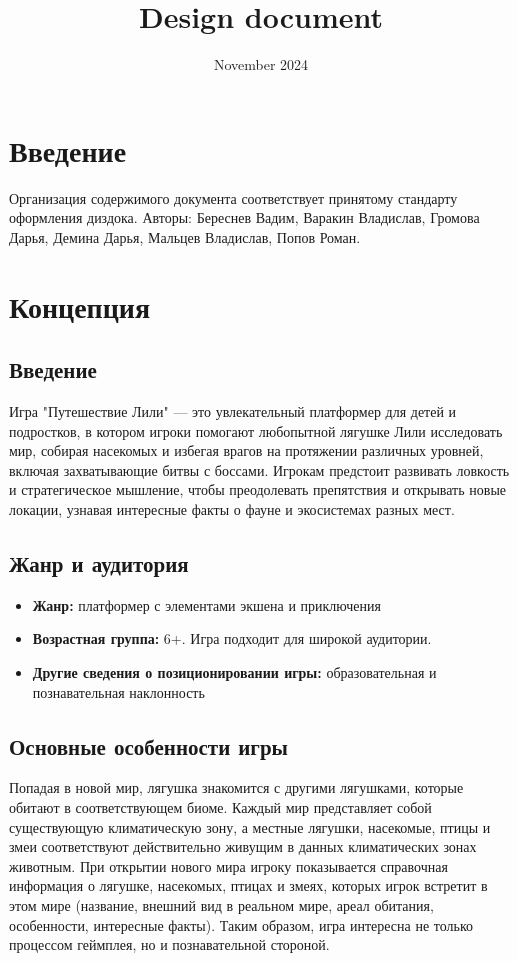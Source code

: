\documentclass{article}
\title{Design document}
\date{November 2024}
\begin{document}
\section{Введение}
Организация содержимого документа соответствует принятому стандарту оформления диздока.
Авторы: Береснев Вадим, Варакин Владислав, Громова Дарья, Демина Дарья, Мальцев Владислав, Попов Роман.

\section{Концепция}

\subsection{Введение}
Игра "Путешествие Лили" — это увлекательный платформер для детей и подростков, в котором игроки помогают любопытной лягушке Лили исследовать мир, собирая насекомых и избегая врагов на протяжении различных уровней, включая захватывающие битвы с боссами. Игрокам предстоит развивать ловкость и стратегическое мышление, чтобы преодолевать препятствия и открывать новые локации, узнавая интересные факты о фауне и экосистемах разных мест.

\subsection{Жанр и аудитория}
\begin{itemize}
    \item \textbf{Жанр:} платформер с элементами экшена и приключения
    \item \textbf{Возрастная группа:} 6+. Игра подходит для широкой аудитории.
    \item \textbf{Другие сведения о позиционировании игры:} образовательная и познавательная наклонность
\end{itemize}

\subsection{Основные особенности игры}
Попадая в новой мир, лягушка знакомится с другими лягушками, которые обитают в соответствующем биоме. Каждый мир представляет собой существующую климатическую зону, а местные лягушки, насекомые, птицы и змеи соответствуют действительно живущим в данных климатических зонах животным. При открытии нового мира игроку показывается справочная информация о лягушке, насекомых, птицах и змеях, которых игрок встретит в этом мире (название, внешний вид в реальном мире, ареал обитания, особенности, интересные факты). Таким образом, игра интересна не только процессом геймплея, но и познавательной стороной.
\end{document}
